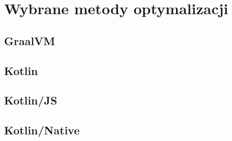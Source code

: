 \chapter{Wybrane metody optymalizacji}\label{chapter:wybrane_metody_optimalizacji}



\section{GraalVM}\label{chapter:graalvm}

\section{Kotlin}\label{chapter:kotlin_multiplatform}

\section{Kotlin/JS}\label{chapter:kotlin_js}

\section{Kotlin/Native}\label{chapter:kotlin_native}
